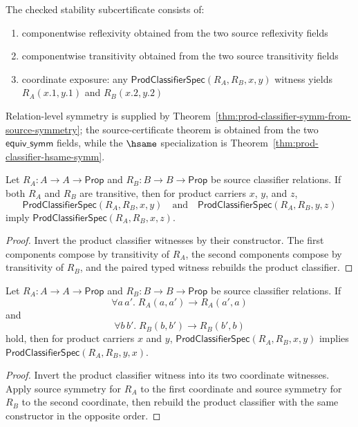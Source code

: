 \begin{definition}
\label{def:prod-stability-certificate}
The checked stability subcertificate consists of:
\begin{enumerate}
  \item componentwise reflexivity obtained from the two source reflexivity fields
  \item componentwise transitivity obtained from the two source transitivity fields
  \item coordinate exposure: any
  $\mathsf{ProdClassifierSpec}(R_A,R_B,x,y)$ witness yields
  $R_A(x.1,y.1)$ and $R_B(x.2,y.2)$
\end{enumerate}
Relation-level symmetry is supplied by
Theorem~\ref{thm:prod-classifier-symm-from-source-symmetry}; the
source-certificate theorem is obtained from the two $\mathsf{equiv\_symm}$
fields, while the $\hsame$ specialization is
Theorem~\ref{thm:prod-classifier-hsame-symm}.
\end{definition}

\begin{theorem}
\label{thm:prod-classifier-transitivity}
Let $R_A : A \to A \to \mathsf{Prop}$ and
$R_B : B \to B \to \mathsf{Prop}$ be source classifier relations.  If both
$R_A$ and $R_B$ are transitive, then for product carriers $x$, $y$, and $z$,
$$
  \mathsf{ProdClassifierSpec}(R_A,R_B,x,y)
  \quad\text{and}\quad
  \mathsf{ProdClassifierSpec}(R_A,R_B,y,z)
$$
imply $\mathsf{ProdClassifierSpec}(R_A,R_B,x,z)$.
\end{theorem}
\begin{proof}
Invert the product classifier witnesses by their constructor. The first
components compose by transitivity of $R_A$, the second components compose by
transitivity of $R_B$, and the paired typed witness rebuilds the product
classifier.
\end{proof}

\begin{theorem}
\label{thm:prod-classifier-symm-from-source-symmetry}
Let $R_A : A \to A \to \mathsf{Prop}$ and
$R_B : B \to B \to \mathsf{Prop}$ be source classifier relations. If
$$
\forall a\,a'.\; R_A(a,a')\to R_A(a',a)
$$
and
$$
\forall b\,b'.\; R_B(b,b')\to R_B(b',b)
$$
hold, then for product carriers $x$ and $y$,
$\mathsf{ProdClassifierSpec}(R_A,R_B,x,y)$ implies
$\mathsf{ProdClassifierSpec}(R_A,R_B,y,x)$.
\end{theorem}
\begin{proof}
Invert the product classifier witness into its two coordinate witnesses.
Apply source symmetry for $R_A$ to the first coordinate and source symmetry for
$R_B$ to the second coordinate, then rebuild the product classifier with the
same constructor in the opposite order.
\end{proof}

